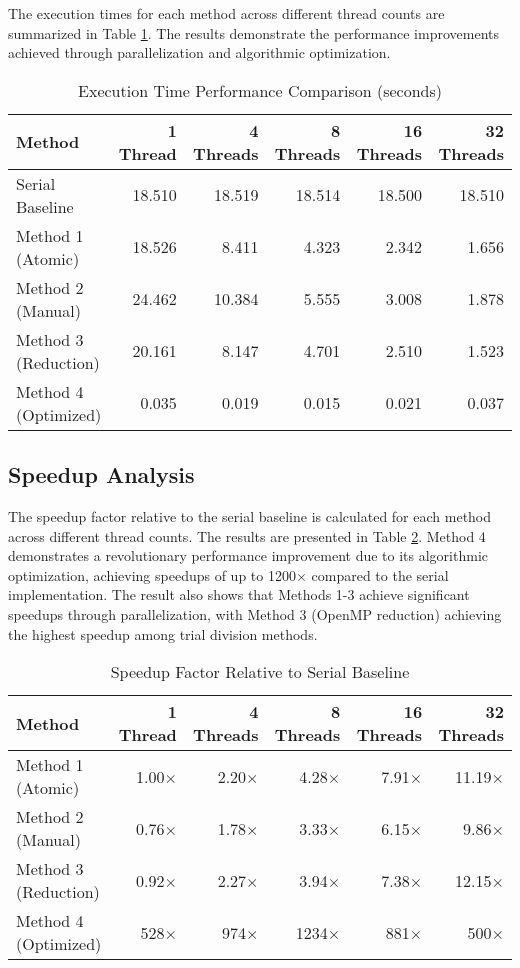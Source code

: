 \documentclass[11pt]{article}
\begin{document}
The execution times for each method across different thread counts are summarized in Table \ref{tab:execution_times}. The results demonstrate the performance improvements achieved through parallelization and algorithmic optimization.
\begin{table}[H]
\centering
\caption{Execution Time Performance Comparison (seconds)}
\label{tab:execution_times}
\footnotesize
\begin{tabular}{lrrrrr}
\hline
\textbf{Method} & \textbf{1 Thread} & \textbf{4 Threads} & \textbf{8 Threads} & \textbf{16 Threads} & \textbf{32 Threads} \\
\hline
Serial Baseline & 18.510 & 18.519 & 18.514 & 18.500 & 18.510 \\
Method 1 (Atomic) & 18.526 & 8.411 & 4.323 & 2.342 & 1.656 \\
Method 2 (Manual) & 24.462 & 10.384 & 5.555 & 3.008 & 1.878 \\
Method 3 (Reduction) & 20.161 & 8.147 & 4.701 & 2.510 & 1.523 \\
Method 4 (Optimized) & 0.035 & 0.019 & 0.015 & 0.021 & 0.037 \\
\hline
\end{tabular}
\end{table}

\subsection{Speedup Analysis}

The speedup factor relative to the serial baseline is calculated for each method across different thread counts. The results are presented in Table \ref{tab:speedup}. Method 4 demonstrates a revolutionary performance improvement due to its algorithmic optimization, achieving speedups of up to 1200$\times$ compared to the serial implementation. The result also shows that Methods 1-3 achieve significant speedups through parallelization, with Method 3 (OpenMP reduction) achieving the highest speedup among trial division methods.
\begin{table}[H]
\centering
\caption{Speedup Factor Relative to Serial Baseline}
\label{tab:speedup}
\footnotesize
\begin{tabular}{lrrrrr}
\hline
\textbf{Method} & \textbf{1 Thread} & \textbf{4 Threads} & \textbf{8 Threads} & \textbf{16 Threads} & \textbf{32 Threads} \\
\hline
Method 1 (Atomic) & 1.00$\times$ & 2.20$\times$ & 4.28$\times$ & 7.91$\times$ & 11.19$\times$ \\
Method 2 (Manual) & 0.76$\times$ & 1.78$\times$ & 3.33$\times$ & 6.15$\times$ & 9.86$\times$ \\
Method 3 (Reduction) & 0.92$\times$ & 2.27$\times$ & 3.94$\times$ & 7.38$\times$ & 12.15$\times$ \\
Method 4 (Optimized) & 528$\times$ & 974$\times$ & 1234$\times$ & 881$\times$ & 500$\times$ \\
\hline
\end{tabular}
\end{table}
\end{document}
